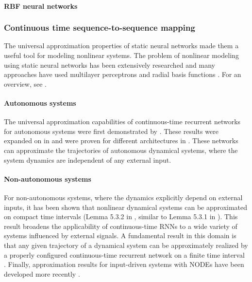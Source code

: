 \documentclass{article}
\theoremstyle{definition}
\theoremstyle{remark}
\newcounter{ct}
\begin{document}
\paragraph{RBF neural networks}
\citep{tan1995efficient}



\subsubsection{Continuous time sequence-to-sequence mapping}
The universal approximation properties of static neural networks \citep{funahashi1989approximate} made them a useful tool for modeling nonlinear systems. 
The problem of nonlinear modeling using static neural networks has been extensively researched \citep{narendra1990identification,warwick1992neural} and many approaches have used multilayer perceptrons and radial basis functions \citep{chen1992neural,choi1996constructive,tan1995efficient}. 
For an overview, see \citep{garces2012strategies}.



\paragraph{Autonomous systems}
The universal approximation capabilities of continuous-time recurrent networks for autonomous systems were first demonstrated by \citet{funahashi1993approximation}. 
These results were expanded on in \citep{kimura1998learning} and were proven for different architectures in \citep{chow2000modeling}.
These networks can approximate the trajectories of autonomous dynamical systems, where the system dynamics are independent of any external input.


\paragraph{Non-autonomous systems}
For non-autonomous systems, where the dynamics explicitly depend on external inputs, it has been shown that nonlinear dynamical systems can be approximated on compact time intervals (Lemma 5.3.2 in \citep{garces2012strategies}, similar to Lemma 5.3.1 in \citep{smale1974differential}).
This result broadens the applicability of continuous-time RNNs to a wide variety of systems influenced by external signals.
A fundamental result in this domain is that any given trajectory of a dynamical system can be approximately realized by a properly configured continuous-time recurrent network on a finite time interval \citep{nakamura2009approximation}.  %
Finally,  approximation results for input-driven systems with NODEs have been developed more recently \citep{ko2023homotopy}.
	
\end{document}
